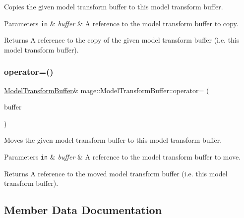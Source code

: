 Copies the given model transform buffer to this model transform buffer.


\begin{DoxyParams}[1]{Parameters}
\mbox{\tt in}  & {\em buffer} & A reference to the model transform buffer to copy. \\
\hline
\end{DoxyParams}
\begin{DoxyReturn}{Returns}
A reference to the copy of the given model transform buffer (i.\+e. this model transform buffer). 
\end{DoxyReturn}
\hypertarget{structmage_1_1_model_transform_buffer_a20bef96b30eda8f63585eb70e20a004c}{}\label{structmage_1_1_model_transform_buffer_a20bef96b30eda8f63585eb70e20a004c} 
\subsubsection{\texorpdfstring{operator=()}{operator=()}\hspace{0.1cm}{\footnotesize\ttfamily [2/2]}}
{\footnotesize\ttfamily \hyperlink{structmage_1_1_model_transform_buffer}{Model\+Transform\+Buffer}\& mage\+::\+Model\+Transform\+Buffer\+::operator= (\begin{DoxyParamCaption}\item[{\hyperlink{structmage_1_1_model_transform_buffer}{Model\+Transform\+Buffer} \&\&}]{buffer }\end{DoxyParamCaption})\hspace{0.3cm}{\ttfamily [default]}}

Moves the given model transform buffer to this model transform buffer.


\begin{DoxyParams}[1]{Parameters}
\mbox{\tt in}  & {\em buffer} & A reference to the model transform buffer to move. \\
\hline
\end{DoxyParams}
\begin{DoxyReturn}{Returns}
A reference to the moved model transform buffer (i.\+e. this model transform buffer). 
\end{DoxyReturn}


\subsection{Member Data Documentation}
\hypertarget{structmage_1_1_model_transform_buffer_a0c51da0491448a7c21da6fce7b77f89f}{}\label{structmage_1_1_model_transform_buffer_a0c51da0491448a7c21da6fce7b77f89f} 
